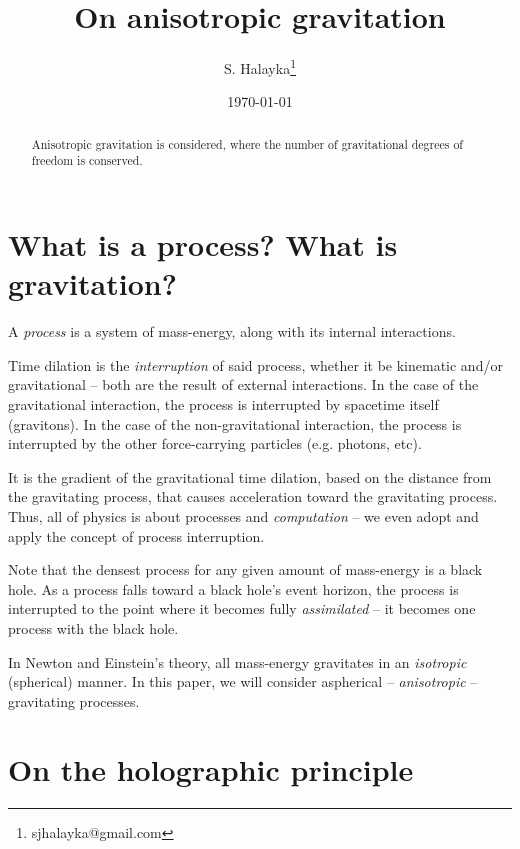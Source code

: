 \documentclass[12pt]{article}
\title{On anisotropic gravitation}
\author{S. Halayka\footnote{sjhalayka@gmail.com}}
\date{\today}
\begin{document}
 
\maketitle

\begin{abstract}
Anisotropic gravitation is considered, where the number of gravitational degrees of freedom is conserved.
\end{abstract}






\section{What is a process? What is gravitation?}

A {\textit{process}} is a system of mass-energy, along with its internal interactions.

Time dilation is the {\textit{interruption}} of said process, whether it be kinematic and/or gravitational -- both are the result of external interactions.
In the case of the gravitational interaction, the process is interrupted by spacetime itself (gravitons).
In the case of the non-gravitational interaction, the process is interrupted by the other force-carrying particles (e.g. photons, etc).

It is the gradient of the gravitational time dilation, based on the distance from the gravitating process, that causes acceleration toward the gravitating process.
Thus, all of physics is about processes and {\textit{computation}} -- we even adopt and apply the concept of process interruption.

Note that the densest process for any given amount of mass-energy is a black hole.
As a process falls toward a black hole's event horizon, the process is interrupted to the point where it becomes fully {\textit{assimilated}} -- it becomes one process with the black hole.

In Newton and Einstein's theory, all mass-energy gravitates in an {\textit{isotropic}} (spherical) manner.
In this paper, we will consider aspherical -- {\textit{anisotropic}} -- gravitating processes.


\section{On the holographic principle}
\end{document}

